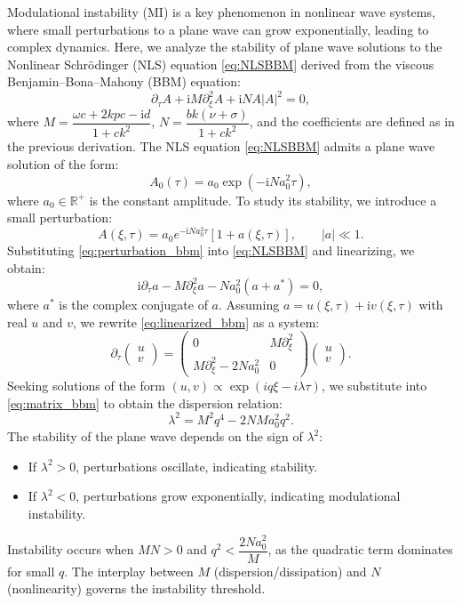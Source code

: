 \documentclass[alpha-refs, 12pt]{wiley-article}
\newcommand{\ui}{\mathrm{i}}
\begin{document}
Modulational instability (MI) is a key phenomenon in nonlinear wave systems, where small perturbations to a plane wave can grow exponentially, leading to complex dynamics. Here, we analyze the stability of plane wave solutions to the Nonlinear Schrödinger (NLS) equation \eqref{eq:NLSBBM} derived from the viscous Benjamin--Bona--Mahony (BBM) equation:
\[
  \partial_\tau A + \ui M \partial_\xi^2 A + \ui N A |A|^2 = 0,
\]
where $M = \dfrac{\omega c + 2 k p c - \ui d}{1 + c k^2}$, $N = \dfrac{b k (\nu + \sigma)}{1 + c k^2}$, and the coefficients are defined as in the previous derivation. The NLS equation \eqref{eq:NLSBBM} admits a plane wave solution of the form:
\begin{equation}\label{eq:plane_wave_bbm}
  A_0(\tau) = a_0 \exp(-\ui N a_0^2 \tau),
\end{equation}
where $a_0 \in \mathbb{R}^+$ is the constant amplitude. To study its stability, we introduce a small perturbation:
\begin{equation}\label{eq:perturbation_bbm}
  A(\xi, \tau) = a_0 e^{-\ui N a_0^2 \tau} [1 + a(\xi, \tau)], \qquad |a| \ll 1.
\end{equation}
Substituting \eqref{eq:perturbation_bbm} into \eqref{eq:NLSBBM} and linearizing, we obtain:
\begin{equation}\label{eq:linearized_bbm}
  \ui \partial_\tau a - M \partial_\xi^2 a - N a_0^2 (a + a^*) = 0,
\end{equation}
where $a^*$ is the complex conjugate of $a$. Assuming $a = u(\xi, \tau) + \ui v(\xi, \tau)$ with real $u$ and $v$, we rewrite \eqref{eq:linearized_bbm} as a system:
\begin{equation}\label{eq:matrix_bbm}
  \partial_\tau \begin{pmatrix} u \\ v \end{pmatrix} = \begin{pmatrix}
  0 & M \partial_\xi^2 \\
  M \partial_\xi^2 - 2 N a_0^2 & 0
\end{pmatrix} \begin{pmatrix} u \\ v \end{pmatrix}.
\end{equation}
Seeking solutions of the form $(u, v) \propto \exp(i q \xi - i \lambda \tau)$, we substitute into \eqref{eq:matrix_bbm} to obtain the dispersion relation:
\begin{equation}\label{eq:dispersion_bbm_b}
  \lambda^2 = M^2 q^4 - 2 N M a_0^2 q^2.
\end{equation}
The stability of the plane wave depends on the sign of $\lambda^2$:
\begin{itemize}
  \item If $\lambda^2 > 0$, perturbations oscillate, indicating stability.
  \item If $\lambda^2 < 0$, perturbations grow exponentially, indicating modulational instability.
\end{itemize}
Instability occurs when $M N > 0$ and $q^2 < \dfrac{2 N a_0^2}{M}$, as the quadratic term dominates for small $q$. The interplay between $M$ (dispersion/dissipation) and $N$ (nonlinearity) governs the instability threshold.
\end{document}
